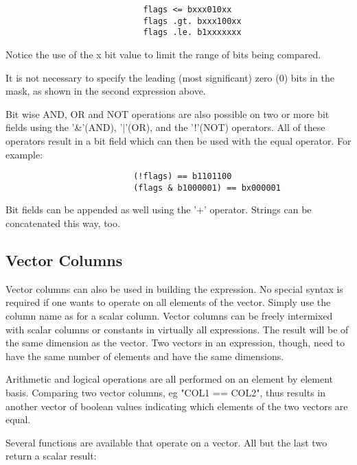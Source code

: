 \documentclass[11pt]{book}
\begin{document}
\begin{verbatim}
                            flags <= bxxx010xx
                            flags .gt. bxxx100xx
                            flags .le. b1xxxxxxx
\end{verbatim}

    Notice the use of the x bit value to limit the range of  bits  being
    compared.

    It  is  not necessary to specify the leading (most significant) zero
    (0) bits in the mask, as shown in the second expression above.

    Bit wise AND, OR and NOT operations are  also  possible  on  two  or
    more  bit  fields  using  the  '\&'(AND),  '$|$'(OR),  and the '!'(NOT)
    operators. All of these operators result in a bit  field  which  can
    then be used with the equal operator. For example:


\begin{verbatim}
                          (!flags) == b1101100
                          (flags & b1000001) == bx000001
\end{verbatim}

    Bit  fields can be appended as well using the '+' operator.  Strings
    can be concatenated this way, too.


\subsection{Vector Columns}

    Vector columns can also be used  in  building  the  expression.   No
    special  syntax  is required if one wants to operate on all elements
    of the vector.  Simply use the column name as for a  scalar  column.
    Vector  columns  can  be  freely  intermixed  with scalar columns or
    constants in virtually all expressions.  The result will be  of  the
    same dimension as the vector.  Two vectors in an expression, though,
    need to  have  the  same  number  of  elements  and  have  the  same
    dimensions.

    Arithmetic and logical operations are all performed on an element by
    element basis.  Comparing two vector columns,  eg  "COL1  ==  COL2",
    thus  results  in  another vector of boolean values indicating which
    elements of the two vectors are equal.

    Several functions are available that operate on a vector.  All but
    the last two return a scalar result:
\end{document}
